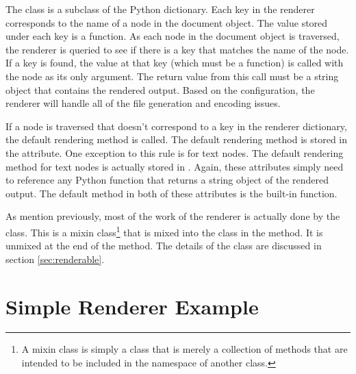 The  class is a subclass of the Python dictionary.
Each key in the renderer corresponds to the name of a node in the
document object.  The value stored under each key is a function.
As each node in the document object is traversed, the renderer is queried
to see if there is a key that matches the name of the node.  If a
key is found, the value at that key (which must be a function) is
called with the node as its only argument.  The return value from this
call must be a string object that contains the rendered output.
Based on the configuration, the renderer will handle all of the file
generation and encoding issues.

If a node is traversed that doesn't correspond to a key in the
renderer dictionary, the default rendering method is called.  The
default rendering method is stored in the  attribute.
One exception to this rule is for text nodes.  The default
rendering method for text nodes is actually stored in .
Again, these attributes simply need to reference any Python function
that returns a string object of the rendered output.  The
default method in both of these attributes is the 
built-in function.

As mention previously, most of the work of the renderer is actually
done by the  class.  This is a mixin class\footnote{
A mixin class is simply a class that is merely a collection of methods
that are intended to be included in the namespace of another class.} that is
mixed into the  class in the  method.
It is unmixed at the end of the  method.  The details
of the  class are discussed in section \ref{sec:renderable}.

\section{Simple Renderer Example}\label{sec:simple-renderer-ex}

